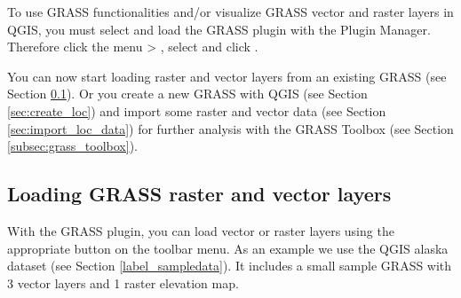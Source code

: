 To use GRASS functionalities and/or visualize GRASS vector and raster layers 
in QGIS, you must select and load the GRASS plugin with the Plugin Manager. 
Therefore click the menu  > , 
select  and click . 

You can now start loading raster and vector layers from an existing GRASS 
 (see Section \ref{sec:load_grassdata}). Or you create a 
new GRASS  with QGIS (see Section \ref{sec:create_loc}) 
and import some raster and vector data (see Section \ref{sec:import_loc_data}) 
for further analysis with the GRASS Toolbox (see Section 
\ref{subsec:grass_toolbox}).

\subsection{Loading GRASS raster and vector layers}\label{sec:load_grassdata}

With the GRASS plugin, you can load vector or raster layers using the
appropriate button on the toolbar menu. As an example we use the QGIS alaska
dataset (see Section \ref{label_sampledata}). It includes a small sample 
GRASS  with 3 vector layers and 1 raster elevation map.


